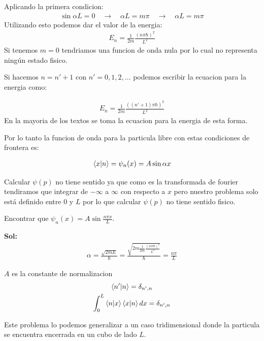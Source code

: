 \documentclass{article}
\newcommand{\caja}[3]{%
  \begin{tcolorbox}[colback=#1!5!white,colframe=#1!25!black,title=#2]
    #3
  \end{tcolorbox}%
}
\begin{document}
Aplicando la primera condicion: 
\begin{gather*}
  \sin{\alpha L } = 0 \quad \rightarrow \quad \alpha L = m \pi \quad \rightarrow \quad \alpha L = m \pi 
\end{gather*}
Utilizando esto podemos dar el valor de la energia: 
\begin{gather*}
  E_n = \displaystyle\frac{1}{ 2m } \displaystyle\frac{(n \pi \hbar  ) ^2}{L ^2} 
\end{gather*}
Si tenemos $ m=0  $ tendriamos una funcion de onda nula por lo cual no representa ningún estado fisico.

Si hacemos $ n = n'+1 $ con $ n' = 0,1,2,...  $ podemos escribir la ecuacion para la energia como: 
\caja{red}{}{
  \begin{gather*}
    E_n = \displaystyle\frac{1}{2m }\displaystyle\frac{((n'+1) \pi \hbar  ) ^2}{L^2 } 
  \end{gather*}
  En la mayoria de los textos se toma la ecuacion para la energia de esta forma. 
}
Por lo tanto la funcion de onda para la particula libre con estas condiciones de frontera es: 
\caja{red}{}{
  \begin{gather*}
    \bra{x }\ket{n } =  \psi_n (x) = A \sin{\alpha x } 
  \end{gather*}
}
Calcular $ \psi(p)  $ no tiene sentido ya que como es la transformada de fourier tendiramos que integrar de $ -\infty $ a $ \infty $ con respecto a $ x $ pero nuestro problema solo está definido entre 0 y $ L  $ por lo que calcular $ \psi(p) $ no tiene sentido fisico. 
\caja{blue}{Ejercicio }{
  Encontrar que $ \psi_n (x) = A \sin{\displaystyle\frac{n \pi x }{L}} $.

  \textbf{Sol: }
  \begin{gather*}
    \alpha = \displaystyle\frac{\sqrt{2m E } }{\hbar } = \displaystyle\frac{\sqrt{2m \displaystyle\frac{1}{2m }\displaystyle\frac{(n \pi \hbar  ) ^2}{L^2 }} 
    }{\hbar } = \displaystyle\frac{n\pi}{L}
  \end{gather*}
}

$ A  $ es la constante de normalizacion
\begin{gather*}
  \bra{n' }\ket{n } = \delta _{n',n } \\
  \displaystyle\int_{0 }^{L } \bra{n }\ket{x }\bra{x }\ket{n }dx = \delta _{n',n } 
\end{gather*}

Este problema lo podemos generalizar a un caso tridimensional donde la particula se encuentra encerrada en un cubo de lado $ L  $.
\end{document}

